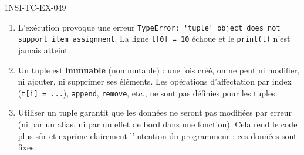 \begin{corrige}{1NSI-TC-EX-049}
\begin{enumerate}
  \item L'exécution provoque une erreur \lstinline{TypeError: 'tuple' object does not support item assignment}. La ligne \lstinline{t[0] = 10} échoue et le \lstinline{print(t)} n'est jamais atteint.

  \item Un tuple est \textbf{immuable} (non mutable) : une fois créé, on ne peut ni modifier, ni ajouter, ni supprimer ses éléments. Les opérations d'affectation par index (\lstinline{t[i] = ...}), \lstinline{append}, \lstinline{remove}, etc., ne sont pas définies pour les tuples.

  \item Utiliser un tuple garantit que les données ne seront pas modifiées par erreur (ni par un alias, ni par un effet de bord dans une fonction). Cela rend le code plus sûr et exprime clairement l'intention du programmeur : ces données sont fixes.
\end{enumerate}
\end{corrige}
